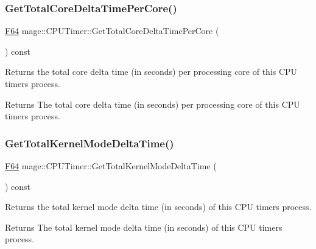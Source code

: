 \subsubsection{\texorpdfstring{Get\+Total\+Core\+Delta\+Time\+Per\+Core()}{GetTotalCoreDeltaTimePerCore()}}
{\footnotesize\ttfamily \hyperlink{namespacemage_ad26233bbec640deda836e572c1a23708}{F64} mage\+::\+C\+P\+U\+Timer\+::\+Get\+Total\+Core\+Delta\+Time\+Per\+Core (\begin{DoxyParamCaption}{ }\end{DoxyParamCaption}) const\hspace{0.3cm}{\ttfamily [noexcept]}}

Returns the total core delta time (in seconds) per processing core of this C\+PU timer\textquotesingle{}s process.

\begin{DoxyReturn}{Returns}
The total core delta time (in seconds) per processing core of this C\+PU timer\textquotesingle{}s process. 
\end{DoxyReturn}
\hypertarget{classmage_1_1_c_p_u_timer_a38cb7adfd830f9d8c7a567f30ebcdf24}{}\label{classmage_1_1_c_p_u_timer_a38cb7adfd830f9d8c7a567f30ebcdf24} 
\subsubsection{\texorpdfstring{Get\+Total\+Kernel\+Mode\+Delta\+Time()}{GetTotalKernelModeDeltaTime()}}
{\footnotesize\ttfamily \hyperlink{namespacemage_ad26233bbec640deda836e572c1a23708}{F64} mage\+::\+C\+P\+U\+Timer\+::\+Get\+Total\+Kernel\+Mode\+Delta\+Time (\begin{DoxyParamCaption}{ }\end{DoxyParamCaption}) const\hspace{0.3cm}{\ttfamily [noexcept]}}

Returns the total kernel mode delta time (in seconds) of this C\+PU timer\textquotesingle{}s process.

\begin{DoxyReturn}{Returns}
The total kernel mode delta time (in seconds) of this C\+PU timer\textquotesingle{}s process. 
\end{DoxyReturn}
\hypertarget{classmage_1_1_c_p_u_timer_ab1128ed37f45445afdfc6d539d721616}{}\label{classmage_1_1_c_p_u_timer_ab1128ed37f45445afdfc6d539d721616} 

